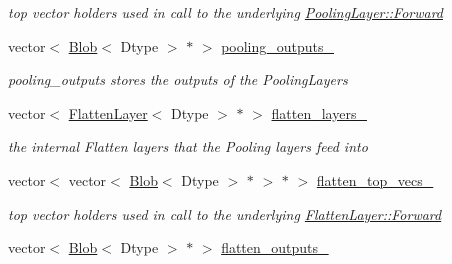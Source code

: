 \begin{DoxyCompactItemize}
\begin{DoxyCompactList}\small\item\em top vector holders used in call to the underlying \hyperlink{classcaffe_1_1Layer_aa5fc9ddb31b58958653372bdaaccde94}{Pooling\+Layer\+::\+Forward} \end{DoxyCompactList}\item 
vector$<$ \hyperlink{classcaffe_1_1Blob}{Blob}$<$ Dtype $>$ $\ast$ $>$ \hyperlink{classcaffe_1_1SPPLayer_aed09b8f30c285651c726ac7ca186f93f}{pooling\+\_\+outputs\+\_\+}\hypertarget{classcaffe_1_1SPPLayer_aed09b8f30c285651c726ac7ca186f93f}{}\label{classcaffe_1_1SPPLayer_aed09b8f30c285651c726ac7ca186f93f}

\begin{DoxyCompactList}\small\item\em pooling\+\_\+outputs stores the outputs of the Pooling\+Layers \end{DoxyCompactList}\item 
vector$<$ \hyperlink{classcaffe_1_1FlattenLayer}{Flatten\+Layer}$<$ Dtype $>$ $\ast$ $>$ \hyperlink{classcaffe_1_1SPPLayer_a765c32194d96177869e2b9028b1ff0d4}{flatten\+\_\+layers\+\_\+}\hypertarget{classcaffe_1_1SPPLayer_a765c32194d96177869e2b9028b1ff0d4}{}\label{classcaffe_1_1SPPLayer_a765c32194d96177869e2b9028b1ff0d4}

\begin{DoxyCompactList}\small\item\em the internal Flatten layers that the Pooling layers feed into \end{DoxyCompactList}\item 
vector$<$ vector$<$ \hyperlink{classcaffe_1_1Blob}{Blob}$<$ Dtype $>$ $\ast$ $>$ $\ast$ $>$ \hyperlink{classcaffe_1_1SPPLayer_a7460ba8ed098335de91cd8cab363d365}{flatten\+\_\+top\+\_\+vecs\+\_\+}\hypertarget{classcaffe_1_1SPPLayer_a7460ba8ed098335de91cd8cab363d365}{}\label{classcaffe_1_1SPPLayer_a7460ba8ed098335de91cd8cab363d365}

\begin{DoxyCompactList}\small\item\em top vector holders used in call to the underlying \hyperlink{classcaffe_1_1Layer_aa5fc9ddb31b58958653372bdaaccde94}{Flatten\+Layer\+::\+Forward} \end{DoxyCompactList}\item 
vector$<$ \hyperlink{classcaffe_1_1Blob}{Blob}$<$ Dtype $>$ $\ast$ $>$ \hyperlink{classcaffe_1_1SPPLayer_afd42f96c91f26fe32427865a16796503}{flatten\+\_\+outputs\+\_\+}\hypertarget{classcaffe_1_1SPPLayer_afd42f96c91f26fe32427865a16796503}{}\label{classcaffe_1_1SPPLayer_afd42f96c91f26fe32427865a16796503}


\end{DoxyCompactItemize}
